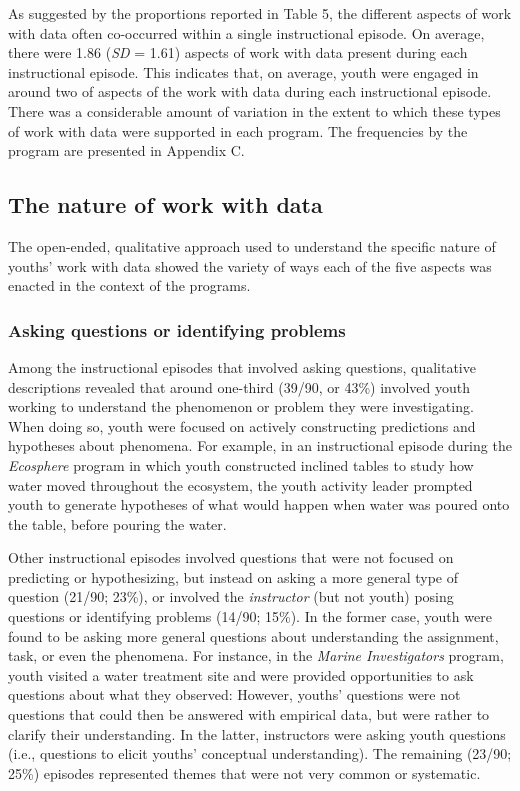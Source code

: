 \documentclass[]{msu-thesis}
\theoremstyle{definition}
\theoremstyle{definition}
\theoremstyle{definition}
\theoremstyle{remark}
\begin{document}
As suggested by the proportions reported in Table 5, the different
aspects of work with data often co-occurred within a single
instructional episode. On average, there were 1.86 (\emph{SD} = 1.61)
aspects of work with data present during each instructional episode.
This indicates that, on average, youth were engaged in around two of
aspects of the work with data during each instructional episode. There
was a considerable amount of variation in the extent to which these
types of work with data were supported in each program. The frequencies
by the program are presented in Appendix C.

\subsection{The nature of work with
data}\label{the-nature-of-work-with-data}

The open-ended, qualitative approach used to understand the specific
nature of youths' work with data showed the variety of ways each of the
five aspects was enacted in the context of the programs.

\subsubsection{Asking questions or identifying
problems}\label{asking-questions-or-identifying-problems}

Among the instructional episodes that involved asking questions,
qualitative descriptions revealed that around one-third (39/90, or 43\%)
involved youth working to understand the phenomenon or problem they were
investigating. When doing so, youth were focused on actively
constructing predictions and hypotheses about phenomena. For example, in
an instructional episode during the \emph{Ecosphere} program in which
youth constructed inclined tables to study how water moved throughout
the ecosystem, the youth activity leader prompted youth to generate
hypotheses of what would happen when water was poured onto the table,
before pouring the water.

Other instructional episodes involved questions that were not focused on
predicting or hypothesizing, but instead on asking a more general type
of question (21/90; 23\%), or involved the \emph{instructor} (but not
youth) posing questions or identifying problems (14/90; 15\%). In the
former case, youth were found to be asking more general questions about
understanding the assignment, task, or even the phenomena. For instance,
in the \emph{Marine Investigators} program, youth visited a water
treatment site and were provided opportunities to ask questions about
what they observed: However, youths' questions were not questions that
could then be answered with empirical data, but were rather to clarify
their understanding. In the latter, instructors were asking youth
questions (i.e., questions to elicit youths' conceptual understanding).
The remaining (23/90; 25\%) episodes represented themes that were not
very common or systematic.
\end{document}
